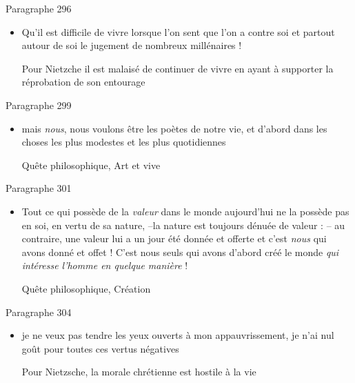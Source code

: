 \documentclass[french,a4paper,11pt,answers]{exam}
\newcommand{\cit}[2]{\og #1 \fg{} \begin{solution}{ #2 }\end{solution}} %
\begin{document}
	\begin{cadre}{Paragraphe 296}
		\begin{itemize}
			\item \cit{Qu'il est difficile de vivre lorsque l'on sent que l'on a contre soi et partout autour de soi le jugement de nombreux millénaires !}
				{Pour Nietzche il est malaisé de continuer de vivre en ayant à supporter la réprobation de son entourage}
		\end{itemize}
	\end{cadre}

	\begin{cadre}{Paragraphe 299}
		\begin{itemize}
			\item \cit{mais \emph{nous}, nous voulons être les poètes de notre vie, et d'abord dans les choses les plus modestes et les plus quotidiennes}
				{Quête philosophique, Art et vive}
		\end{itemize}
	\end{cadre}
	\begin{cadre}{Paragraphe 301}
		\begin{itemize}
			\item \cit{Tout ce qui possède de la \emph{valeur} dans le monde aujourd'hui ne la possède pas en soi, en vertu de sa nature, --la nature est toujours dénuée de valeur : -- au contraire, une valeur lui a un jour été donnée et offerte et c'est \emph{nous} qui avons donné et offet ! C'est nous seuls qui avons d'abord créé le monde \emph{qui intéresse l'homme en quelque manière} !}
				{Quête philosophique, Création}
		\end{itemize}
	\end{cadre}
	
	\begin{cadre}{Paragraphe 304}
		\begin{itemize}
			\item \cit{je ne veux pas tendre les yeux ouverts à mon appauvrissement, je n'ai nul goût pour toutes ces vertus négatives}
				{Pour Nietzsche, la morale chrétienne est hostile à la vie}
		\end{itemize}
	\end{cadre}
	
\end{document}

